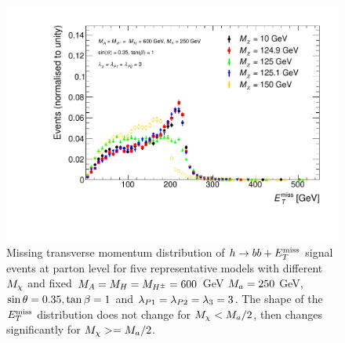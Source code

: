 \begin{figure}[tbp]
\centering
\includegraphics[width=\textwidth]{texinputs/04_grid/figures/monoHbb_mDM_scan_MET_liny_norm2one.pdf}
\caption[$\MET$ distribution in $h\rightarrow bb + \MET$ events for different $\mDM$]
{
Missing transverse momentum distribution  of $h\rightarrow bb + \MET$ signal events at parton level for five representative models with different $\mDM$
and fixed $M_{A} = M_{H} = M_{H^{\pm}} = 600 $ GeV $M_{a} = 250$ GeV, $ \sin\theta = 0.35, \tan\beta = 1$ and $ \lambda_{P1} = \lambda_{P2} = \lambda_{3} = 3 $. 
The shape of the $\MET$ distribution does not change for $M_{\chi} < M_{a}/2$, then changes significantly for $M_{\chi}>=M_{a}/2$.
%
}
\label{fig:monoHbb_mDM_scan_met}
\end{figure}

